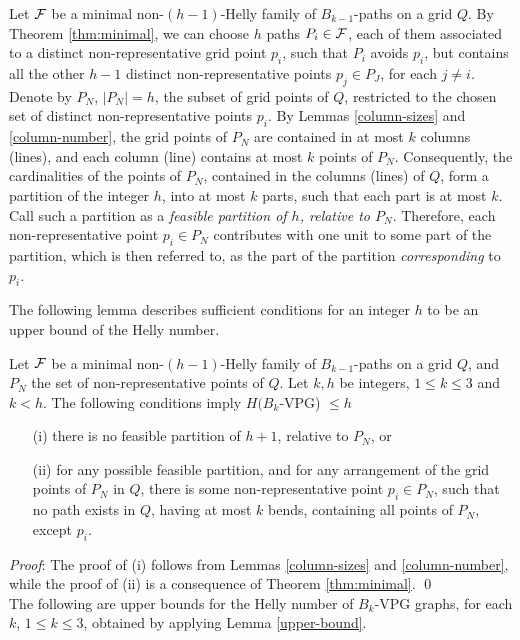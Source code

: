 Let $\cal F$ be a minimal non-$(h-1)$-Helly family of $B_{k-1}$-paths on a grid $Q$. By Theorem \ref{thm:minimal},  we can choose $h$ paths $P_i \in {\cal F}$, each of them associated to a distinct non-representative grid point $p_i$, such that $P_i$ avoids $p_i$, but contains all the other $h-1$ distinct non-representative points $p_j \in P_J$, for each   $j \neq i$. Denote by $P_N$, $|P_N|=h$, the subset of grid  points of  $Q$, restricted to the chosen set of distinct  non-representative points $p_i$. By Lemmas \ref{column-sizes} and \ref{column-number}, the grid points of $P_N$ are contained in at most $k$ columns (lines), and each column (line) contains at most $k$ points of $P_N$. Consequently, the cardinalities of the points of $P_N$, contained in the columns (lines) of $Q$,  form a partition of the integer $h$, into at most $k$ parts, such that each part is at most $k$. Call such a partition as a {\it feasible  partition  of $h$, relative to $P_N$}. Therefore, each non-representative point $p_i \in P_N$ contributes with one unit to some part of the partition, which is then referred to,   as the part of the partition {\it corresponding} to $p_i$.    

The following lemma describes sufficient conditions for an integer $h$ to be an upper bound of the Helly number.

\begin{lemma}\label{upper-bound} Let $\cal F$ be a minimal non-$(h-1)$-Helly family of $B_{k-1}$-paths on a grid $Q$, and $P_N$ the set of non-representative points of $Q$. Let $k,h$ be integers, $1 \leq k \leq 3$ and $k < h$. The following conditions imply $H(B_k$-VPG) $\leq h$  
\begin{itemize}
    \item[(i)] there is no feasible partition of $h+1$, relative to $P_N$, or 
    \item[(ii)] for any possible feasible partition, and for any arrangement of the grid points of $P_N$ in $Q$, there is some non-representative point $p_i \in P_N$, such that  no path exists  in $Q$, having at most $k$ bends, containing all points of $P_N$, except $p_i$.    
\end{itemize}
\end{lemma}
{\it Proof}: The proof of (i) follows from Lemmas \ref{column-sizes} and \ref{column-number}, while the proof of (ii) is a consequence of Theorem \ref{thm:minimal}.  \qed \\

The following are upper bounds for the Helly number of $B_k$-VPG graphs, for each $k$, $1 \leq k \leq 3$, obtained  by applying Lemma \ref{upper-bound}.      
 
